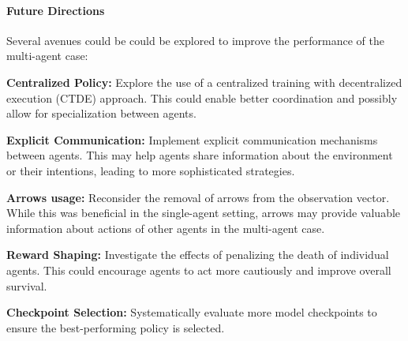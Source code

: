 \documentclass[12pt,a4paper, onecolumn]{exam}
\begin{document}
\paragraph{Future Directions}
Several avenues could be could be explored to improve the performance of the multi-agent case:

\textbf{Centralized Policy:} Explore the use of a centralized training with decentralized execution (CTDE) approach.
This could enable better coordination and possibly allow for specialization between agents.

\textbf{Explicit Communication:} Implement explicit communication mechanisms between agents. This may help agents share information
about the environment or their intentions, leading to more sophisticated strategies.

\textbf{Arrows usage:} Reconsider the removal of arrows from the observation vector. While this was beneficial in the single-agent setting,
arrows may provide valuable information about actions of other agents in the multi-agent case.

\textbf{Reward Shaping:} Investigate the effects of penalizing the death of individual agents.
This could encourage agents to act more cautiously and improve overall survival.

\textbf{Checkpoint Selection:} Systematically evaluate more model checkpoints to ensure the best-performing policy is selected.
\end{document}
